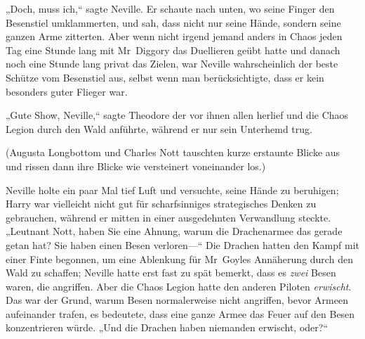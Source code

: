 „Doch, muss ich,“ sagte Neville. Er schaute nach unten, wo seine Finger den Besenstiel umklammerten, und sah, dass nicht nur seine Hände, sondern seine ganzen Arme zitterten. Aber wenn nicht irgend jemand anders in Chaos jeden Tag eine Stunde lang mit Mr~Diggory das Duellieren geübt hatte und danach noch eine Stunde lang privat das Zielen, war Neville wahrscheinlich der beste Schütze vom Besenstiel aus, selbst wenn man berücksichtigte, dass er kein besonders guter Flieger war.

„Gute Show, Neville,“ sagte Theodore der vor ihnen allen herlief und die Chaos Legion durch den Wald anführte, während er nur sein Unterhemd trug.

(Augusta Longbottom und Charles Nott tauschten kurze erstaunte Blicke aus und rissen dann ihre Blicke wie versteinert voneinander los.)

Neville holte ein paar Mal tief Luft und versuchte, seine Hände zu beruhigen; Harry war vielleicht nicht gut für scharfsinniges strategisches Denken zu gebrauchen, während er mitten in einer ausgedehnten Verwandlung steckte. „Leutnant Nott, haben Sie eine Ahnung, warum die Drachenarmee das gerade getan hat? Sie haben einen Besen verloren—“ Die Drachen hatten den Kampf mit einer Finte begonnen, um eine Ablenkung für Mr~Goyles Annäherung durch den Wald zu schaffen; Neville hatte erst fast zu spät bemerkt, dass es \emph{zwei} Besen waren, die angriffen. Aber die Chaos Legion hatte den anderen Piloten \emph{erwischt}. Das war der Grund, warum Besen normalerweise nicht angriffen, bevor Armeen aufeinander trafen, es bedeutete, dass eine ganze Armee das Feuer auf den Besen konzentrieren würde. „Und die Drachen haben niemanden erwischt, oder?“

